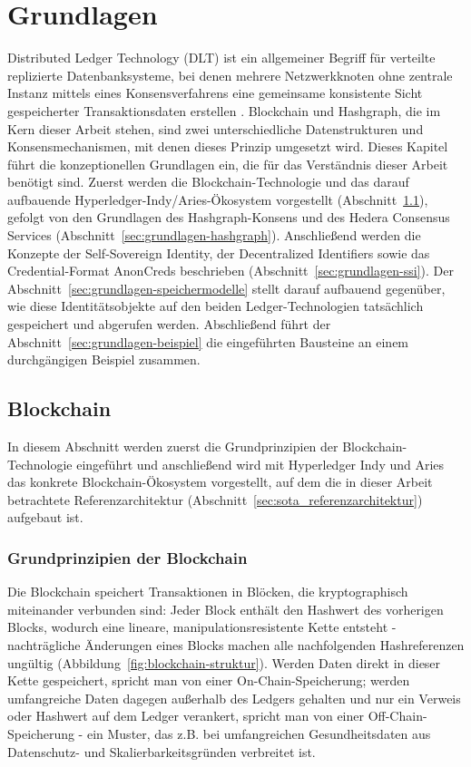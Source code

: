\chapter{Grundlagen}
\label{cha:grundlagen}

Distributed Ledger Technology (DLT) ist ein allgemeiner Begriff für verteilte replizierte Datenbanksysteme, bei denen mehrere Netzwerkknoten ohne zentrale Instanz mittels eines Konsensverfahrens eine gemeinsame konsistente Sicht gespeicherter Transaktionsdaten erstellen \cite{ferdous2020}. Blockchain und Hashgraph, die im Kern dieser Arbeit stehen, sind zwei unterschiedliche Datenstrukturen und Konsensmechanismen, mit denen dieses Prinzip umgesetzt wird. Dieses Kapitel führt die konzeptionellen Grundlagen ein, die für das Verständnis dieser Arbeit benötigt sind. Zuerst werden die Blockchain-Technologie und das darauf aufbauende Hyperledger-Indy/Aries-Ökosystem vorgestellt (Abschnitt~\ref{sec:grundlagen-blockchain}), gefolgt von den Grundlagen des Hashgraph-Konsens und des Hedera Consensus Services (Abschnitt~\ref{sec:grundlagen-hashgraph}). Anschließend werden die Konzepte der Self-Sovereign Identity, der Decentralized Identifiers sowie das Credential-Format AnonCreds beschrieben (Abschnitt~\ref{sec:grundlagen-ssi}). Der Abschnitt~\ref{sec:grundlagen-speichermodelle} stellt darauf aufbauend gegenüber, wie diese Identitätsobjekte auf den beiden Ledger-Technologien tatsächlich gespeichert und abgerufen werden. Abschließend führt der Abschnitt~\ref{sec:grundlagen-beispiel} die eingeführten Bausteine an einem durchgängigen Beispiel zusammen.

\section{Blockchain}
\label{sec:grundlagen-blockchain}
In diesem Abschnitt werden zuerst die Grundprinzipien der Blockchain-Technologie eingeführt und anschließend wird mit Hyperledger Indy und Aries das konkrete Blockchain-Ökosystem vorgestellt, auf dem die in dieser Arbeit betrachtete Referenzarchitektur (Abschnitt~\ref{sec:sota_referenzarchitektur}) aufgebaut ist.

\subsection{Grundprinzipien der Blockchain}
Die Blockchain speichert Transaktionen in Blöcken, die kryptographisch miteinander verbunden sind: Jeder Block enthält den Hashwert des vorherigen Blocks, wodurch eine lineare, manipulationsresistente Kette entsteht - nachträgliche Änderungen eines Blocks machen alle nachfolgenden Hashreferenzen ungültig (Abbildung~\ref{fig:blockchain-struktur}). Werden Daten direkt in dieser Kette gespeichert, spricht man von einer On-Chain-Speicherung; werden umfangreiche Daten dagegen außerhalb des Ledgers gehalten und nur ein Verweis oder Hashwert auf dem Ledger verankert, spricht man von einer Off-Chain-Speicherung - ein Muster, das z.B. bei umfangreichen Gesundheitsdaten aus Datenschutz- und Skalierbarkeitsgründen verbreitet ist. \cite{ferdous2020}


